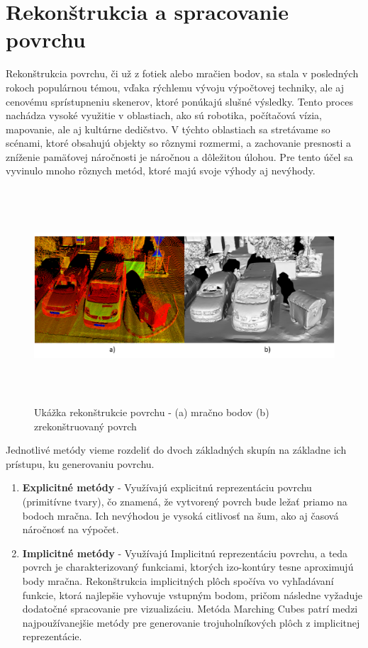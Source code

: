 \section{Rekonštrukcia a spracovanie povrchu}
\noindent Rekonštrukcia povrchu, či už z fotiek alebo mračien bodov, sa stala v posledných rokoch populárnou témou, vďaka rýchlemu vývoju výpočtovej techniky, ale aj cenovému sprístupneniu skenerov, ktoré ponúkajú slušné výsledky. Tento proces nachádza vysoké využitie v oblastiach, ako sú robotika, počítačová vízia, mapovanie, ale aj kultúrne dedičstvo. V týchto oblastiach sa stretávame so scénami, ktoré obsahujú objekty so rôznymi rozmermi, a zachovanie presnosti a zníženie pamäťovej náročnosti je náročnou a dôležitou úlohou. Pre tento účel sa vyvinulo mnoho rôznych metód, ktoré majú svoje výhody aj nevýhody.
\begin{figure}[!htbp]
  \centering
  \includegraphics[width=16cm, height=8cm]{img/mesh_example.png}
  \caption{Ukážka rekonštrukcie povrchu - (a) mračno bodov (b) zrekonštruovaný povrch}
  \label{recons}
\end{figure} 
\newline\indent Jednotlivé metódy vieme rozdeliť do dvoch základných skupín na základne ich prístupu, ku generovaniu povrchu.
\begin{enumerate}
    \item\textbf{Explicitné metódy} - Využívajú explicitnú reprezentáciu povrchu (primitívne tvary), čo znamená, že vytvorený povrch bude ležať priamo na bodoch mračna. Ich nevýhodou je vysoká citlivosť na šum, ako aj časová náročnosť na výpočet.
    \item\textbf{Implicitné metódy} - Využívajú Implicitnú reprezentáciu povrchu, a teda povrch je charakterizovaný funkciami, ktorých izo-kontúry tesne aproximujú body mračna. Rekonštrukcia implicitných plôch spočíva vo vyhľadávaní funkcie, ktorá najlepšie vyhovuje vstupným bodom, pričom následne vyžaduje dodatočné spracovanie pre vizualizáciu. Metóda Marching Cubes patrí medzi najpoužívanejšie metódy pre generovanie trojuholníkových plôch z implicitnej reprezentácie. \cite{Reconstruction_general}
\end{enumerate}


